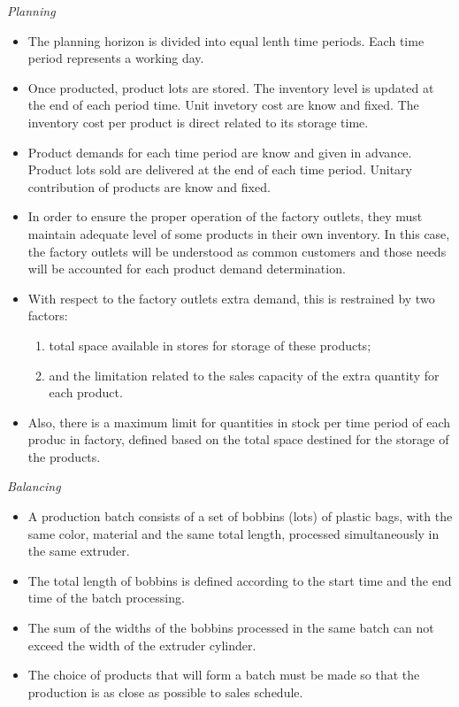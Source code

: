 \emph{Planning}

\begin{itemize}
\item The planning horizon is divided into equal lenth time periods. Each time period represents a working day.
\item Once producted, product lots are stored. The inventory level is updated at the end of each period time. Unit invetory cost are know and fixed. The inventory cost per product is direct related to its storage time.
\item Product demands for each time period are know and given in advance. Product lots sold are delivered at the end of each time period. Unitary contribution of products are know and fixed.
\item In order to ensure the proper operation of the factory outlets, they must maintain adequate level of some products in their own inventory. In this case, the factory outlets will be understood as common customers and those needs will be accounted for each product demand determination.
\item With respect to the factory outlets extra demand, this is restrained by two factors: 
		 \begin{enumerate}
		 \item total space available in stores for storage of these products;
		 \item and the limitation related to the sales capacity of the extra quantity for each product.
		 \end{enumerate}
\item Also, there is a maximum limit for quantities in stock per time period of each produc in factory, defined based on the total space destined for the storage of the products.
\end{itemize}

\emph{Balancing}

\begin{itemize}
\item A production batch consists of a set of bobbins (lots) of plastic bags, with the same color, material and the same total length, processed simultaneously in the same extruder.
\item The total length of bobbins is defined according to the start time and the end time of the batch processing.
\item The sum of the widths of the bobbins processed in the same batch can not exceed the width of the extruder cylinder.
\item The choice of products that will form a batch must be made so that the production is as close as possible to sales schedule.
\end{itemize}

